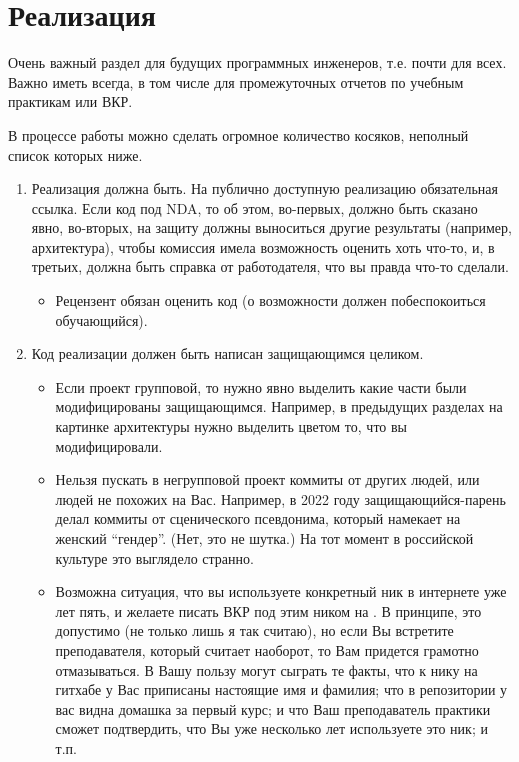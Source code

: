 
\section{Реализация}
Очень важный раздел для будущих программных инженеров, т.е. почти для всех. Важно иметь всегда, в том числе для промежуточных отчетов по учебным практикам или ВКР.

В процессе работы можно сделать огромное количество косяков, неполный список которых ниже.

\begin{enumerate}
  \item Реализация должна быть. На публично доступную реализацию обязательная ссылка. Если код под \textsc{NDA}, то об этом,
  во-первых, должно быть сказано явно,
  во-вторых, на защиту должны выно\-ситься другие результаты (например, архитектура), чтобы комис\-сия имела возможность оценить хоть что-то,
  и, в третьих, должна быть справка от работодателя, что вы правда что-то сделали.
        \begin{itemize}
          \item  Рецензент обязан оценить код (о возможности должен побеспо\-коиться обучающийся).
        \end{itemize}
  \item Код реализации должен быть написан защищающимся целиком.
        \begin{itemize}
          \item  Если проект групповой, то нужно явно выделить какие части были модифицированы защищающимся. Например, в преды\-дущих разделах на картинке архитектуры нужно выделить цветом то, что вы модифицировали.
          \item Нельзя пускать в негрупповой проект коммиты от других людей, или людей не похожих на Вас. Например, в 2022 году защищающийся-парень делал коммиты от сценического псев\-донима, который намекает на женский \enquote{гендер}. (Нет, это не шутка.) На тот момент в российской культуре это выглядело странно.
          \item Возможна ситуация, что вы используете конкретный ник в интернете уже лет пять, и желаете писать ВКР под этим ником на \GitHub{}. В принципе, это допустимо (не только лишь я так считаю), но если Вы встретите преподавателя, который считает наоборот, то Вам придется грамотно отмазы\-ваться. В Вашу пользу могут сыграть те факты, что к нику на гитхабе у Вас приписаны настоящие имя и фамилия; что в репозитории у вас видна домашка за первый курс; и что Ваш преподаватель практики сможет подтвердить, что Вы уже несколько лет используете это ник; и т.п.

\end{itemize}
\end{enumerate}
